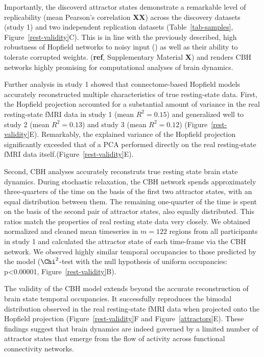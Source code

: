 \documentclass{article}
\begin{document}
Importantly, the discoverd attractor states demonstrate a remarkable level of replicability (mean Pearson's correlation \textbf{XX}) across the discovery datasets (study 1) and two independent replication datasets (Table~\ref{tab-samples}, Figure~\ref{rest-validity}C).
This is in line with the previously described, high robustness of Hopfield networks to noisy input (\href{https://doi.org/10.1073/pnas.79.8.2554}{}) as well as their ability to tolerate corrupted weights. (\textbf{ref}, Supplementary Material \textbf{X}) and renders CBH networks highly promising for computational analyses of brain dynamics.

Further analysis in study 1 showed that connectome-based Hopfield models accurately reconstructed multiple characteristics of true resting-state data.
First, the Hopfield projection accounted for a substantial amount of variance in the real resting-state fMRI data in study 1 (mean $R^2=0.15$) and generalized well to study 2 (mean $R^2=0.13$) and study 3 (mean $R^2=0.12$) (Figure~\ref{rest-validity}E).
Remarkably, the explained variance of the Hopfield projection significantly exceeded that of a PCA performed directly on the real resting-state fMRI data itself.(Figure~\ref{rest-validity}E).

Second, CBH analyses accurately reconstruts true resting state brain state dynamics.
During stochastic relaxation, the CBH network spends approximately three-quarters of the time on the basis of the first two attractor states, with an equal distribution between them.
The remaining one-quarter of the time is spent on the basis of the second pair of attractor states, also equally distributed.
This ratios match the properties of real resting state data very closely. We obtained normalized and cleaned mean timeseries in $m=122$ regions from all participants in study 1 and calculated the attractor state of each time-frame via the CBH network. We observed highly similar temporal occupancies to those predicted by the model ($\Chi^2$-test with the null hypothesis of uniform occupancies: p\textless 0.00001, Figure~\ref{rest-validity}B).

The validity of the CBH model extends beyond the accurate reconstruction of brain state temporal occupancies. It successfully reproduces the bimodal distribution observed in the real resting-state fMRI data when projected onto the Hopfield projection (Figure~\ref{rest-validity}F and Figure~\ref{attractors}E). These findings suggest that brain dynamics are indeed governed by a limited number of attractor states that emerge from the flow of activity across functional connectivity networks.
\end{document}
